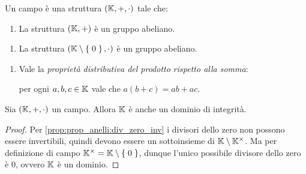\begin{remark}
    Un campo è una struttura $(\mathbb{K}, +, \cdot)$ tale che: 
    \begin{enumerate}[label={(S)}]
        \item La struttura $(\mathbb{K}, +)$ è un gruppo abeliano.
    \end{enumerate}
    \begin{enumerate}[label={(P)}]
        \item La struttura $(\mathbb{K}\setminus \left\{\;0\;\right\}, \cdot)$ è un gruppo abeliano.
    \end{enumerate}
    \begin{enumerate}[label=(D)]
        \item \label{def:campo:distr} Vale la \emph{proprietà distributiva del prodotto rispetto alla somma}:
         
        per ogni $a, b, c \in \mathbb{K}$ vale che $a(b + c) = ab + ac$.
    \end{enumerate}
\end{remark}

\begin{proposition}
     Sia $(\mathbb{K}, +, \cdot)$ un campo. Allora $\mathbb{K}$ è anche un dominio di integrità.
\end{proposition}
\begin{proof}
    Per \ref{prop:prop_anelli:div_zero_inv} i divisori dello zero non possono essere invertibili, quindi devono essere un sottoinsieme di $\mathbb{K} \setminus \mathbb{K}^{\times}$. Ma per definizione di campo $\mathbb{K}^{\times} = \mathbb{K} \setminus \left\{\;0\;\right\}$, dunque l'unico possibile divisore dello zero è $0$, ovvero $\mathbb{K}$ è un dominio.
\end{proof}

